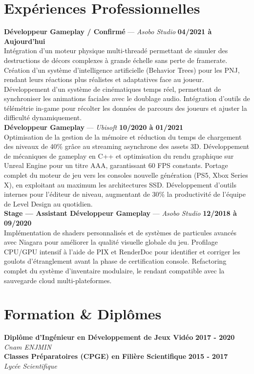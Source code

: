 \documentclass[11pt,a4paper]{article}
\begin{document}
\section*{Expériences Professionnelles}
\noindent \textbf{Développeur Gameplay / Confirmé} --- \textit{Asobo Studio} \hfill \textbf{04/2021 à Aujourd'hui} \\
Intégration d'un moteur physique multi-threadé permettant de simuler des destructions de décors complexes à grande échelle sans perte de framerate. Création d'un système d'intelligence artificielle (Behavior Trees) pour les PNJ, rendant leurs réactions plus réalistes et adaptatives face au joueur. Développement d'un système de cinématiques temps réel, permettant de synchroniser les animations faciales avec le doublage audio. Intégration d'outils de télémétrie in-game pour récolter les données de parcours des joueurs et ajuster la difficulté dynamiquement. \\[0.3cm]
\noindent \textbf{Développeur Gameplay} --- \textit{Ubisoft} \hfill \textbf{10/2020 à 01/2021} \\
Optimisation de la gestion de la mémoire et réduction du temps de chargement des niveaux de 40\% grâce au streaming asynchrone des assets 3D. Développement de mécaniques de gameplay en C++ et optimisation du rendu graphique sur Unreal Engine pour un titre AAA, garantissant 60 FPS constants. Portage complet du moteur de jeu vers les consoles nouvelle génération (PS5, Xbox Series X), en exploitant au maximum les architectures SSD. Développement d'outils internes pour l'éditeur de niveau, augmentant de 30\% la productivité de l'équipe de Level Design au quotidien. \\[0.3cm]
\noindent \textbf{Stage — Assistant Développeur Gameplay} --- \textit{Asobo Studio} \hfill \textbf{12/2018 à 09/2020} \\
Implémentation de shaders personnalisés et de systèmes de particules avancés avec Niagara pour améliorer la qualité visuelle globale du jeu. Profilage CPU/GPU intensif à l'aide de PIX et RenderDoc pour identifier et corriger les goulots d'étranglement avant la phase de certification console. Refactoring complet du système d'inventaire modulaire, le rendant compatible avec la sauvegarde cloud multi-plateformes. \\[0.3cm]


\vspace{0.3cm}

\section*{Formation \& Diplômes}
\noindent \textbf{Diplôme d'Ingénieur en Développement de Jeux Vidéo} \hfill \textbf{2017 - 2020} \\
\textit{Cnam ENJMIN} \\[0.3cm]
\noindent \textbf{Classes Préparatoires (CPGE) en Filière Scientifique} \hfill \textbf{2015 - 2017} \\
\textit{Lycée Scientifique} \\[0.3cm]
\end{document}
